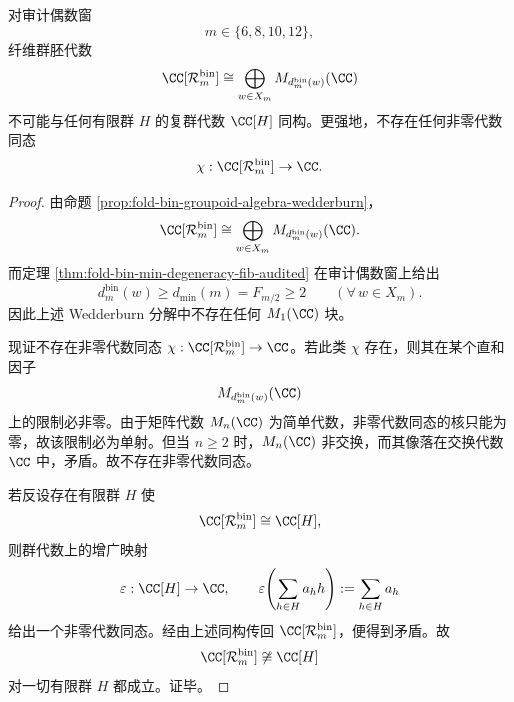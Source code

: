 \begin{theorem}[审计偶数窗上的纤维群胚代数不可能是有限群代数]\label{thm:xi-time-part60aa-audited-even-groupoid-no-finite-group-algebra}
对审计偶数窗
\[
m\in\{6,8,10,12\},
\]
纤维群胚代数
\[
\CC[\mathcal R_m^{\mathrm{bin}}]
\cong
\bigoplus_{w\in X_m}M_{d_m^{\mathrm{bin}}(w)}(\CC)
\]
不可能与任何有限群 \(H\) 的复群代数 \(\CC[H]\) 同构。更强地，不存在任何非零代数同态
\[
\chi:\CC[\mathcal R_m^{\mathrm{bin}}]\to\CC.
\]
\end{theorem}
\begin{proof}
由命题 \ref{prop:fold-bin-groupoid-algebra-wedderburn}，
\[
\CC[\mathcal R_m^{\mathrm{bin}}]
\cong
\bigoplus_{w\in X_m}M_{d_m^{\mathrm{bin}}(w)}(\CC).
\]
而定理 \ref{thm:fold-bin-min-degeneracy-fib-audited} 在审计偶数窗上给出
\[
d_m^{\mathrm{bin}}(w)\ge d_{\min}(m)=F_{m/2}\ge 2
\qquad(\forall\,w\in X_m).
\]
因此上述 Wedderburn 分解中不存在任何 \(M_1(\CC)\) 块。

现证不存在非零代数同态 \(\chi:\CC[\mathcal R_m^{\mathrm{bin}}]\to\CC\)。若此类 \(\chi\) 存在，则其在某个直和因子
\[
M_{d_m^{\mathrm{bin}}(w)}(\CC)
\]
上的限制必非零。由于矩阵代数 \(M_n(\CC)\) 为简单代数，非零代数同态的核只能为零，故该限制必为单射。但当 \(n\ge 2\) 时，\(M_n(\CC)\) 非交换，而其像落在交换代数 \(\CC\) 中，矛盾。故不存在非零代数同态。

若反设存在有限群 \(H\) 使
\[
\CC[\mathcal R_m^{\mathrm{bin}}]\cong \CC[H],
\]
则群代数上的增广映射
\[
\varepsilon:\CC[H]\to\CC,
\qquad
\varepsilon\!\left(\sum_{h\in H}a_h h\right):=\sum_{h\in H}a_h
\]
给出一个非零代数同态。经由上述同构传回 \(\CC[\mathcal R_m^{\mathrm{bin}}]\)，便得到矛盾。故
\[
\CC[\mathcal R_m^{\mathrm{bin}}]\not\cong \CC[H]
\]
对一切有限群 \(H\) 都成立。证毕。
\end{proof}

